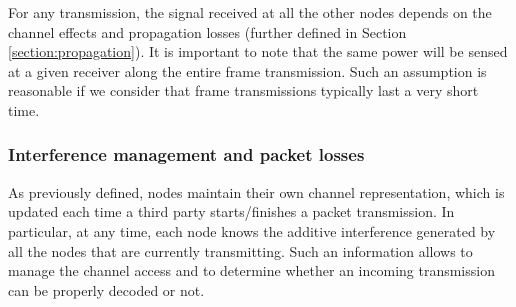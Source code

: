 \documentclass[a4paper]{article}
\begin{document}
	For any transmission, the signal received at all the other nodes depends on the channel effects and propagation losses (further defined in Section \ref{section:propagation}). It is important to note that the same power will be sensed at a given receiver along the entire frame transmission. Such an assumption is reasonable if we consider that frame transmissions typically last a very short time.
	
	\subsubsection{Interference management and packet losses}
	\label{section:interference}
	As previously defined, nodes maintain their own channel representation, which is updated each time a third party starts/finishes a packet transmission. In particular, at any time, each node knows the additive interference generated by all the nodes that are currently transmitting. Such an information allows to manage the channel access and to determine whether an incoming transmission can be properly decoded or not. 
	
\end{document}

